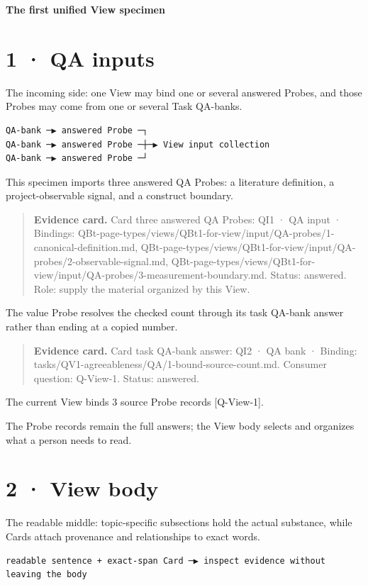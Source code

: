 \documentclass[11pt]{article}
\begin{document}
\begin{center}\LARGE\textbf{The first unified View specimen}\end{center}
\section*{1 · QA inputs}
The incoming side: one View may bind one or several answered Probes, and those Probes may come from one or several Task QA-banks.

\begin{Verbatim}[fontsize=\small]
QA-bank ─▶ answered Probe ─┐
QA-bank ─▶ answered Probe ─┼─▶ View input collection
QA-bank ─▶ answered Probe ─┘
\end{Verbatim}
This specimen imports three answered QA Probes: a literature definition, a project-observable signal, and a construct boundary.

\begin{quote}\footnotesize\textbf{Evidence card.} Card three answered QA Probes: QI1 · QA input · Bindings: QBt-page-types/views/QBt1-for-view/input/QA-probes/1-canonical-definition.md, QBt-page-types/views/QBt1-for-view/input/QA-probes/2-observable-signal.md, QBt-page-types/views/QBt1-for-view/input/QA-probes/3-measurement-boundary.md. Status: answered. Role: supply the material organized by this View.\end{quote}
The value Probe resolves the checked count through its task QA-bank answer rather than ending at a copied number.

\begin{quote}\footnotesize\textbf{Evidence card.} Card task QA-bank answer: QI2 · QA bank · Binding: tasks/QV1-agreeableness/QA/1-bound-source-count.md. Consumer question: Q-View-1. Status: answered.\end{quote}
The current View binds 3 source Probe records [Q-View-1].

The Probe records remain the full answers; the View body selects and organizes what a person needs to read.

\section*{2 · View body}
The readable middle: topic-specific subsections hold the actual substance, while Cards attach provenance and relationships to exact words.

\begin{Verbatim}[fontsize=\small]
readable sentence + exact-span Card ─▶ inspect evidence without leaving the body
\end{Verbatim}
\end{document}

